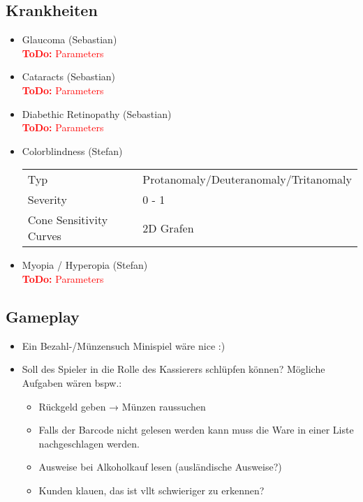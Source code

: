 \documentclass[a4paper, 11pt]{scrartcl}
\newcommand{\todo}[1]{\textcolor{Red}{\textbf{ToDo: }#1}}
\newcommand{\entwickler}[1]{\textcolor{BurntOrange}{(#1)}}
\newcommand{\Stefan}{\entwickler{Stefan}}
\newcommand{\Sebastian}{\entwickler{Sebastian}}
\begin{document}
\subsection{Krankheiten}
\begin{itemize}
    \item Glaucoma \Sebastian \\
    \todo{Parameters}
    \item Cataracts \Sebastian \\
    \todo{Parameters}
    \item Diabethic Retinopathy \Sebastian \\
    \todo{Parameters}
    \item Colorblindness \Stefan \\
    \begin{tabular}{ll}
        Typ & Protanomaly/Deuteranomaly/Tritanomaly \\
        Severity & 0 - 1 \\
        Cone Sensitivity Curves & 2D Grafen \\
    \end{tabular}
    \item Myopia / Hyperopia \Stefan \\
    \todo{Parameters}
\end{itemize}



\subsection{Gameplay}
\begin{itemize}
    \item Ein Bezahl-/Münzensuch Minispiel wäre nice :)
    \item Soll des Spieler in die Rolle des Kassierers schlüpfen können?
    Mögliche Aufgaben wären bspw.:
    \begin{itemize}
        \item Rückgeld geben → Münzen raussuchen
        \item Falls der Barcode nicht gelesen werden kann muss die Ware
        in einer Liste nachgeschlagen werden.
        \item Ausweise bei Alkoholkauf lesen (ausländische Ausweise?)
        \item Kunden klauen, das ist vllt schwieriger zu erkennen?
    \end{itemize}
\end{itemize}
\end{document}
